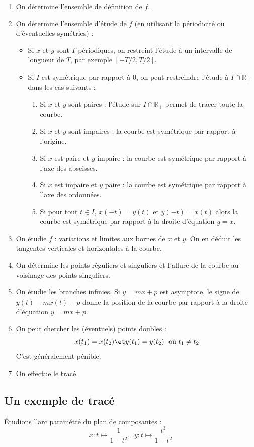 \documentclass[a4paper,10pt]{report}
\begin{document}
\begin{enumerate}
\item On détermine l'ensemble de définition de $f$.
\item On détermine l'ensemble d'étude de $f$ (en utilisant la périodicité ou d'éventuelles symétries) :
\begin{itemize}
\item Si $x$ et $y$ sont $T$-périodiques, on restreint l'étude à un intervalle de longueur de $T$, par exemple $[-T/2,T/2]$.
\item Si $I$ est symétrique par rapport à $0$, on peut restreindre l'étude à $I \cap \mathbb{R}_+$ dans les cas suivants :
\begin{enumerate}
\item Si $x$ et $y$ sont paires : l'étude sur $I \cap \mathbb{R}_+$ permet de tracer toute la courbe.
\item Si $x$ et $y$ sont impaires : la courbe est symétrique par rapport à l'origine.
\item Si $x$ est paire et $y$ impaire : la courbe est symétrique par rapport à l'axe des abscisses.
\item Si $x$ est impaire et $y$ paire : la courbe est symétrique par rapport à l'axe des ordonnées.
\item Si pour tout $t \in I$, $x(-t)=y(t)$ et $y(-t)=x(t)$ alors la courbe est symétrique par rapport à la droite d'équation $y=x$.
\end{enumerate}
\end{itemize}
\item On étudie $f$ : variations et limites aux bornes de $x$ et $y$. On en déduit les tangentes verticales et horizontales à la courbe.
\item On détermine les points réguliers et singuliers et l'allure de la courbe au voisinage des points singuliers.
\item On étudie les branches infinies. Si $y=mx+p$ est asymptote, le signe de $y(t)-mx(t)-p$ donne la position de la courbe par rapport à la droite d'équation $y=mx+p$.
\item On peut chercher les (éventuels) points doubles :
$$ x(t_1)=x(t_2) \et y(t_1)=y(t_2) \; \hbox{ où } t_1 \neq t_2$$
C'est généralement pénible.
\item On effectue le tracé.
\end{enumerate}

\subsection{Un exemple de tracé}
Étudions l'arc paramétré du plan de composantes :
$$ x : t \mapsto \dfrac{1}{1-t^2}, \; \, y : t \mapsto \dfrac{t^3}{1-t^2}$$
\end{document}
